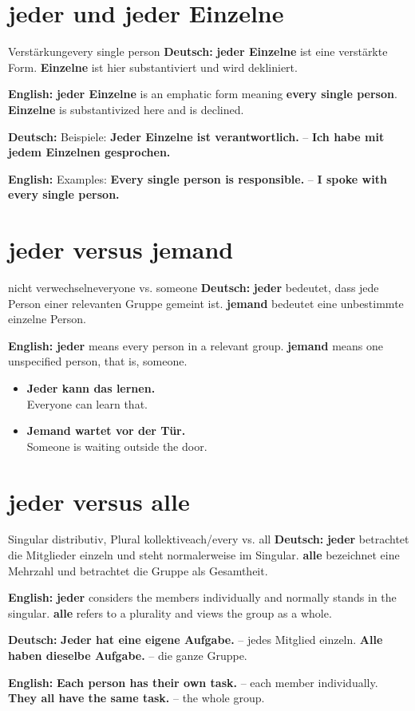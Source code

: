 \documentclass[a4paper,11pt]{article}
\newcommand{\GermanText}[1]{\textbf{Deutsch: }#1\par}
\newcommand{\EnglishText}[1]{{\small\color{SoftGray}\textbf{English: }#1\par}}
\newcommand{\ExampleItem}[2]{\item \textbf{#1}\\{\small\color{SoftGray}#2}}
\begin{document}
\section{jeder und jeder Einzelne}
\begin{grammarentry}{Verstärkung}{every single person}
\GermanText{\textbf{jeder Einzelne} ist eine verstärkte Form. \textbf{Einzelne} ist hier substantiviert und wird dekliniert.}
\EnglishText{\textbf{jeder Einzelne} is an emphatic form meaning \textbf{every single person}. \textbf{Einzelne} is substantivized here and is declined.}
\GermanText{Beispiele: \textbf{Jeder Einzelne ist verantwortlich.} -- \textbf{Ich habe mit jedem Einzelnen gesprochen.}}
\EnglishText{Examples: \textbf{Every single person is responsible.} -- \textbf{I spoke with every single person.}}
\end{grammarentry}

\section{jeder versus jemand}
\begin{grammarentry}{nicht verwechseln}{everyone vs. someone}
\GermanText{\textbf{jeder} bedeutet, dass jede Person einer relevanten Gruppe gemeint ist. \textbf{jemand} bedeutet eine unbestimmte einzelne Person.}
\EnglishText{\textbf{jeder} means every person in a relevant group. \textbf{jemand} means one unspecified person, that is, someone.}
\end{grammarentry}

\begin{exbox}
\begin{itemize}
\ExampleItem{Jeder kann das lernen.}{Everyone can learn that.}
\ExampleItem{Jemand wartet vor der Tür.}{Someone is waiting outside the door.}
\end{itemize}
\end{exbox}

\section{jeder versus alle}
\begin{grammarentry}{Singular distributiv, Plural kollektiv}{each/every vs. all}
\GermanText{\textbf{jeder} betrachtet die Mitglieder einzeln und steht normalerweise im Singular. \textbf{alle} bezeichnet eine Mehrzahl und betrachtet die Gruppe als Gesamtheit.}
\EnglishText{\textbf{jeder} considers the members individually and normally stands in the singular. \textbf{alle} refers to a plurality and views the group as a whole.}
\GermanText{\textbf{Jeder hat eine eigene Aufgabe.} -- jedes Mitglied einzeln. \textbf{Alle haben dieselbe Aufgabe.} -- die ganze Gruppe.}
\EnglishText{\textbf{Each person has their own task.} -- each member individually. \textbf{They all have the same task.} -- the whole group.}
\end{grammarentry}
\end{document}
